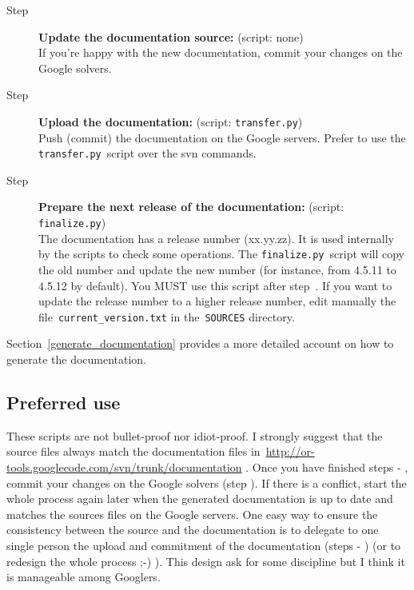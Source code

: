 \documentclass[a4paper,10pt]{article}
\newcommand{\code}[1]{\texttt{#1}}
\begin{document}
\begin{description}
 \item[Step ] {\bf Update the documentation source:} (script: none)\\If you're happy with the new documentation, commit your changes on the Google solvers. 
 \item[Step ] {\bf Upload the documentation:} (script: \code{transfer.py})\\Push (commit) the documentation on the Google servers. Prefer to use the \code{transfer.py}~script over the svn commands.
 \item[Step ] {\bf Prepare the next release of the documentation:} (script: \code{finalize.py})\\The documentation has a release number (xx.yy.zz). It is used internally by the scripts to check some operations. The \code{finalize.py}~script will copy the old number and update the new number (for instance, from 4.5.11 to 4.5.12 by default). You MUST use this script after step~. If you want to update the release number to a higher release number, edit manually the file~\code{current\_version.txt} in the~\code{SOURCES} directory.
\end{description}

Section~\ref{generate_documentation} provides a more detailed account on how to generate the documentation.

\subsection{Preferred use}

These scripts are not bullet-proof nor idiot-proof. I strongly suggest that the source files always match the documentation files in~\href{http://or-tools.googlecode.com/svn/trunk/documentation}{http://or-tools.googlecode.com/svn/trunk/documentation} . Once you have finished steps  - , commit your changes on the Google solvers (step ). If there is a conflict, start the whole process again later when the generated documentation is up to date and matches the sources files on the Google servers. One easy way to ensure the consistency between the source and the documentation is to delegate to one single person the upload and commitment of the documentation (steps  - ) (or to redesign the whole process ;-) ). This design ask for some discipline but I think it is manageable among Googlers.
\end{document}

